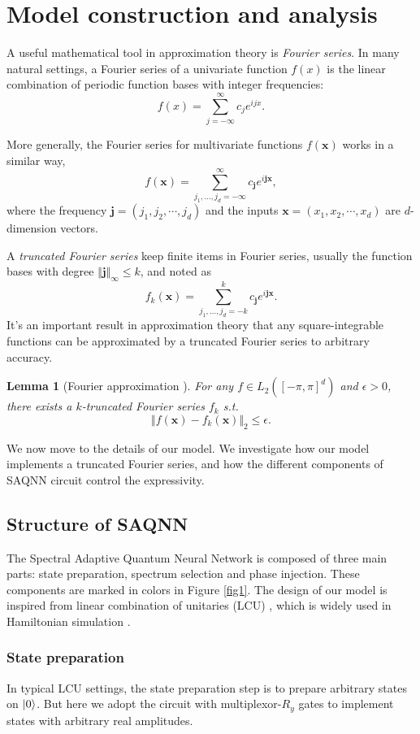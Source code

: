 \documentclass{article}
\theoremstyle{plain}
\newtheorem{lemma}[theorem]{Lemma}
\theoremstyle{definition}
\theoremstyle{remark}
\begin{document}
\section{Model construction and analysis}\label{sec3}
A useful mathematical tool in approximation theory is \textit{Fourier series}. In many natural settings, a Fourier series of a univariate function $f(x)$ is the linear combination of periodic function bases with integer frequencies:
$$
f(x)= \sum_{j=-\infty}^{\infty} c_j e^{ijx}.
$$

More generally, the Fourier series for multivariate functions $f(\boldsymbol{x})$ works in a similar way,
$$
f(\boldsymbol{x}) = \sum_{j_1,\dotsc,j_d=-\infty}^{\infty} c_{\boldsymbol{j}} e^{i\boldsymbol{j x}},
$$
where the frequency $\boldsymbol{j}=(j_1,j_2,\cdots,j_d)$ and the inputs $\boldsymbol{x}=(x_1,x_2,\cdots,x_d)$ are $d$-dimension vectors.

A \textit{truncated Fourier series} keep finite items in Fourier series, usually the function bases with degree $\Vert \boldsymbol{j}\Vert_\infty \leq k$, and noted as
$$
f_k(\boldsymbol{x}) = \sum_{j_1,\dotsc,j_d=-k}^{k} c_{\boldsymbol{j}} e^{i\boldsymbol{j x}}.
$$
It's an important result in approximation theory that any square-integrable functions can be approximated by a truncated Fourier series to arbitrary accuracy.
\begin{lemma}[Fourier approximation \cite{stein1971,rivlin1981,weisz2012}]
\label{lemma:approx}
    For any $f\in L_2([-\pi,\pi]^d)$ and $\epsilon>0$, there exists a $k$-truncated Fourier series $f_k$ s.t.
    $$
    \Vert f(\boldsymbol{x})-f_k(\boldsymbol{x})\Vert_2 \leq \epsilon.
    $$
\end{lemma}
We now move to the details of our model. We investigate how our model implements a truncated Fourier series, and how the different components of SAQNN circuit control the expressivity.

\subsection{Structure of SAQNN}
The Spectral Adaptive Quantum Neural Network is composed of three main parts: state preparation, spectrum selection and phase injection. These components are marked in colors in Figure \ref{fig1}. The design of our model is inspired from linear combination of unitaries (LCU) \cite{childs2012,gilyen2019}, which is widely used in Hamiltonian simulation \cite{berry2015,chakraborty2024}.


\subsubsection{State preparation}
In typical LCU settings, the state preparation step is to prepare arbitrary states on $\ket{0}$. But here we adopt the circuit with multiplexor-$R_y$ gates to implement states with arbitrary real amplitudes.  
\end{document}
